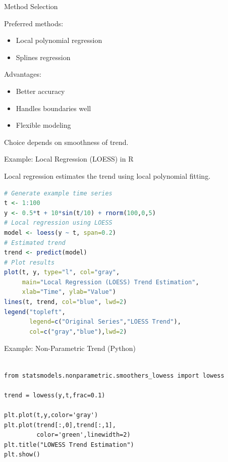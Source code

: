 \documentclass[aspectratio=169]{beamer}
\begin{document}
\begin{frame}{Method Selection}

Preferred methods:

\begin{itemize}

\item Local polynomial regression

\item Splines regression

\end{itemize}

Advantages:

\begin{itemize}

\item Better accuracy

\item Handles boundaries well

\item Flexible modeling

\end{itemize}

Choice depends on smoothness of trend.

\end{frame}

\begin{frame}[fragile]{Example: Local Regression (LOESS) in R}

Local regression estimates the trend using local polynomial fitting.

\begin{lstlisting}[language=R]
# Generate example time series
t <- 1:100
y <- 0.5*t + 10*sin(t/10) + rnorm(100,0,5)
# Local regression using LOESS
model <- loess(y ~ t, span=0.2)
# Estimated trend
trend <- predict(model)
# Plot results
plot(t, y, type="l", col="gray",
     main="Local Regression (LOESS) Trend Estimation",
     xlab="Time", ylab="Value")
lines(t, trend, col="blue", lwd=2)
legend("topleft",
       legend=c("Original Series","LOESS Trend"),
       col=c("gray","blue"),lwd=2)

\end{lstlisting}

\end{frame}

\begin{frame}[fragile]{Example: Non-Parametric Trend (Python)}

\begin{lstlisting}

from statsmodels.nonparametric.smoothers_lowess import lowess

trend = lowess(y,t,frac=0.1)

plt.plot(t,y,color='gray')
plt.plot(trend[:,0],trend[:,1],
         color='green',linewidth=2)
plt.title("LOWESS Trend Estimation")
plt.show()

\end{lstlisting}

\end{frame}
\end{document}

